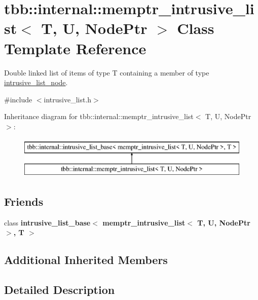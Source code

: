 \hypertarget{classtbb_1_1internal_1_1memptr__intrusive__list}{}\section{tbb\+:\+:internal\+:\+:memptr\+\_\+intrusive\+\_\+list$<$ T, U, Node\+Ptr $>$ Class Template Reference}
\label{classtbb_1_1internal_1_1memptr__intrusive__list}


Double linked list of items of type T containing a member of type \hyperlink{structtbb_1_1internal_1_1intrusive__list__node}{intrusive\+\_\+list\+\_\+node}.  




{\ttfamily \#include $<$intrusive\+\_\+list.\+h$>$}

Inheritance diagram for tbb\+:\+:internal\+:\+:memptr\+\_\+intrusive\+\_\+list$<$ T, U, Node\+Ptr $>$\+:\begin{figure}[H]
\begin{center}
\leavevmode
\includegraphics[height=2.000000cm]{classtbb_1_1internal_1_1memptr__intrusive__list}
\end{center}
\end{figure}
\subsection*{Friends}
\begin{DoxyCompactItemize}
\item 
\hypertarget{classtbb_1_1internal_1_1memptr__intrusive__list_ac6df6ea4ad2922821e998056197560ae}{}class {\bfseries intrusive\+\_\+list\+\_\+base$<$ memptr\+\_\+intrusive\+\_\+list$<$ T, U, Node\+Ptr $>$, T $>$}\label{classtbb_1_1internal_1_1memptr__intrusive__list_ac6df6ea4ad2922821e998056197560ae}

\end{DoxyCompactItemize}
\subsection*{Additional Inherited Members}


\subsection{Detailed Description}
